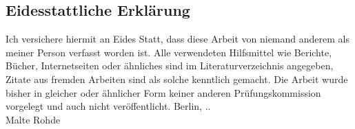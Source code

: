 \subsection*{Eidesstattliche Erklärung}

Ich versichere hiermit an Eides Statt, dass diese Arbeit von niemand anderem als
meiner Person verfasst worden ist. Alle verwendeten Hilfsmittel wie Berichte,
Bücher, Internetseiten oder ähnliches sind im Literaturverzeichnis angegeben,
Zitate aus fremden Arbeiten sind als solche kenntlich gemacht. Die Arbeit wurde
bisher in gleicher oder ähnlicher Form keiner anderen Prüfungskommission
vorgelegt und auch nicht veröffentlicht. \parbig
Berlin, \the\day{}.\the\month{}.\the\year\\[16ex]
Malte Rohde